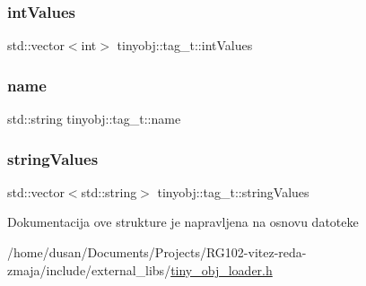 \subsubsection{\texorpdfstring{int\+Values}{intValues}}
{\footnotesize\ttfamily std\+::vector$<$int$>$ tinyobj\+::tag\+\_\+t\+::int\+Values}

\mbox{\label{structtinyobj_1_1tag__t_a9b3650154d2fbd83dad945ebcf6bd448}} 
\subsubsection{\texorpdfstring{name}{name}}
{\footnotesize\ttfamily std\+::string tinyobj\+::tag\+\_\+t\+::name}

\mbox{\label{structtinyobj_1_1tag__t_a25634eea923961fd5b2520ea782397e8}} 
\subsubsection{\texorpdfstring{string\+Values}{stringValues}}
{\footnotesize\ttfamily std\+::vector$<$std\+::string$>$ tinyobj\+::tag\+\_\+t\+::string\+Values}



Dokumentacija ove strukture je napravljena na osnovu datoteke \begin{DoxyCompactItemize}
\item 
/home/dusan/\+Documents/\+Projects/\+R\+G102-\/vitez-\/reda-\/zmaja/include/external\+\_\+libs/\hyperlink{tiny__obj__loader_8h}{tiny\+\_\+obj\+\_\+loader.\+h}\end{DoxyCompactItemize}
